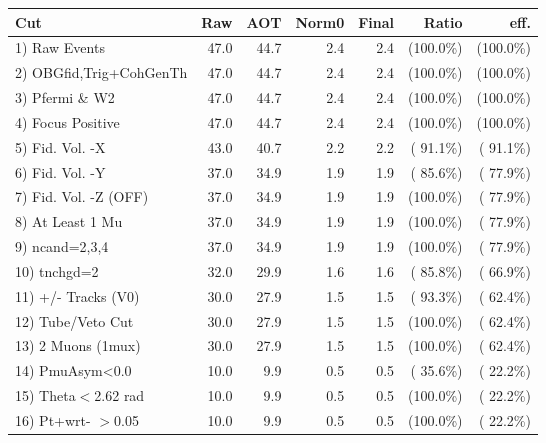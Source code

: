  \begin{table}[h!]\centering
 \begin{tabular}{||l||r|r|r|r|r|r||}
 \hline
 \hline
 Cut & Raw & AOT & Norm0 & Final & Ratio & eff.       \\
 \hline
  1) Raw Events           &         47.0 &         44.7 &          2.4 &          2.4 & (100.0\%) & (100.0\%) \\
  2) OBGfid,Trig+CohGenTh &         47.0 &         44.7 &          2.4 &          2.4 & (100.0\%) & (100.0\%) \\
  3) Pfermi \& W2         &         47.0 &         44.7 &          2.4 &          2.4 & (100.0\%) & (100.0\%) \\
  4) Focus Positive       &         47.0 &         44.7 &          2.4 &          2.4 & (100.0\%) & (100.0\%) \\
  5) Fid. Vol. -X         &         43.0 &         40.7 &          2.2 &          2.2 & ( 91.1\%) & ( 91.1\%) \\
  6) Fid. Vol. -Y         &         37.0 &         34.9 &          1.9 &          1.9 & ( 85.6\%) & ( 77.9\%) \\
  7) Fid. Vol. -Z (OFF)   &         37.0 &         34.9 &          1.9 &          1.9 & (100.0\%) & ( 77.9\%) \\
  8) At Least 1 Mu        &         37.0 &         34.9 &          1.9 &          1.9 & (100.0\%) & ( 77.9\%) \\
  9) ncand=2,3,4          &         37.0 &         34.9 &          1.9 &          1.9 & (100.0\%) & ( 77.9\%) \\
 10) tnchgd=2             &         32.0 &         29.9 &          1.6 &          1.6 & ( 85.8\%) & ( 66.9\%) \\
 11) +/- Tracks (V0)      &         30.0 &         27.9 &          1.5 &          1.5 & ( 93.3\%) & ( 62.4\%) \\
 12) Tube/Veto Cut        &         30.0 &         27.9 &          1.5 &          1.5 & (100.0\%) & ( 62.4\%) \\
 13) 2 Muons (1mux)       &         30.0 &         27.9 &          1.5 &          1.5 & (100.0\%) & ( 62.4\%) \\
 14) PmuAsym<0.0          &         10.0 &          9.9 &          0.5 &          0.5 & ( 35.6\%) & ( 22.2\%) \\
 15) Theta$<$2.62 rad     &         10.0 &          9.9 &          0.5 &          0.5 & (100.0\%) & ( 22.2\%) \\
 16) Pt+wrt- $>$0.05      &         10.0 &          9.9 &          0.5 &          0.5 & (100.0\%) & ( 22.2\%) \\

\end{tabular}
\end{table}
